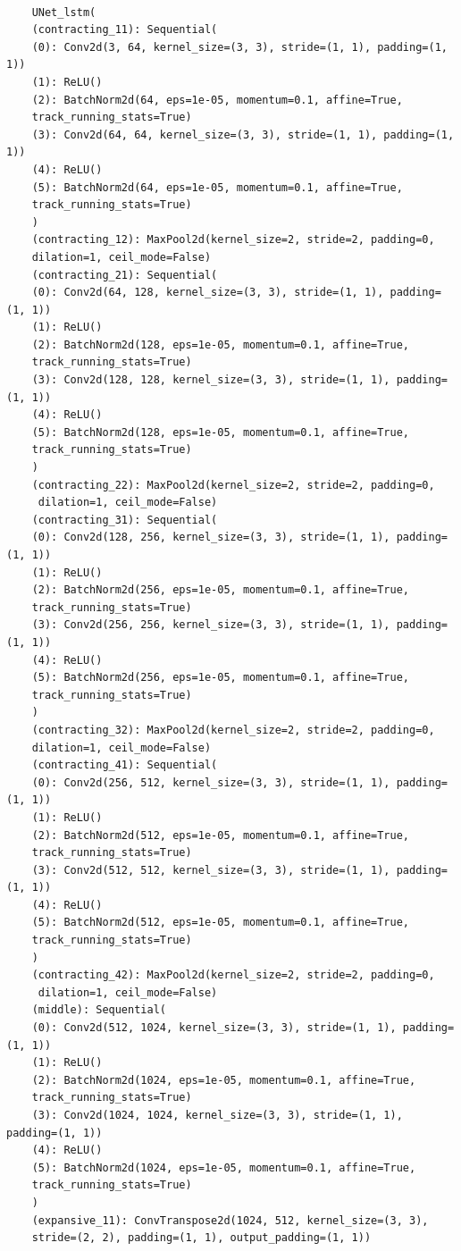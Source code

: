 	\begin{lstlisting}[caption={Unet LSTM model architecture description},label=lst:unetlstm]
	
	UNet_lstm(
	(contracting_11): Sequential(
	(0): Conv2d(3, 64, kernel_size=(3, 3), stride=(1, 1), padding=(1, 1))
	(1): ReLU()
	(2): BatchNorm2d(64, eps=1e-05, momentum=0.1, affine=True, 
	track_running_stats=True)
	(3): Conv2d(64, 64, kernel_size=(3, 3), stride=(1, 1), padding=(1, 1))
	(4): ReLU()
	(5): BatchNorm2d(64, eps=1e-05, momentum=0.1, affine=True, 
	track_running_stats=True)
	)
	(contracting_12): MaxPool2d(kernel_size=2, stride=2, padding=0, 
	dilation=1, ceil_mode=False)
	(contracting_21): Sequential(
	(0): Conv2d(64, 128, kernel_size=(3, 3), stride=(1, 1), padding=(1, 1))
	(1): ReLU()
	(2): BatchNorm2d(128, eps=1e-05, momentum=0.1, affine=True, 
	track_running_stats=True)
	(3): Conv2d(128, 128, kernel_size=(3, 3), stride=(1, 1), padding=(1, 1))
	(4): ReLU()
	(5): BatchNorm2d(128, eps=1e-05, momentum=0.1, affine=True, 
	track_running_stats=True)
	)
	(contracting_22): MaxPool2d(kernel_size=2, stride=2, padding=0,
	 dilation=1, ceil_mode=False)
	(contracting_31): Sequential(
	(0): Conv2d(128, 256, kernel_size=(3, 3), stride=(1, 1), padding=(1, 1))
	(1): ReLU()
	(2): BatchNorm2d(256, eps=1e-05, momentum=0.1, affine=True, 
	track_running_stats=True)
	(3): Conv2d(256, 256, kernel_size=(3, 3), stride=(1, 1), padding=(1, 1))
	(4): ReLU()
	(5): BatchNorm2d(256, eps=1e-05, momentum=0.1, affine=True, 
	track_running_stats=True)
	)
	(contracting_32): MaxPool2d(kernel_size=2, stride=2, padding=0, 
	dilation=1, ceil_mode=False)
	(contracting_41): Sequential(
	(0): Conv2d(256, 512, kernel_size=(3, 3), stride=(1, 1), padding=(1, 1))
	(1): ReLU()
	(2): BatchNorm2d(512, eps=1e-05, momentum=0.1, affine=True, 
	track_running_stats=True)
	(3): Conv2d(512, 512, kernel_size=(3, 3), stride=(1, 1), padding=(1, 1))
	(4): ReLU()
	(5): BatchNorm2d(512, eps=1e-05, momentum=0.1, affine=True, 
	track_running_stats=True)
	)
	(contracting_42): MaxPool2d(kernel_size=2, stride=2, padding=0,
	 dilation=1, ceil_mode=False)
	(middle): Sequential(
	(0): Conv2d(512, 1024, kernel_size=(3, 3), stride=(1, 1), padding=(1, 1))
	(1): ReLU()
	(2): BatchNorm2d(1024, eps=1e-05, momentum=0.1, affine=True, 
	track_running_stats=True)
	(3): Conv2d(1024, 1024, kernel_size=(3, 3), stride=(1, 1), padding=(1, 1))
	(4): ReLU()
	(5): BatchNorm2d(1024, eps=1e-05, momentum=0.1, affine=True, 
	track_running_stats=True)
	)
	(expansive_11): ConvTranspose2d(1024, 512, kernel_size=(3, 3), 
	stride=(2, 2), padding=(1, 1), output_padding=(1, 1))

\end{lstlisting}
